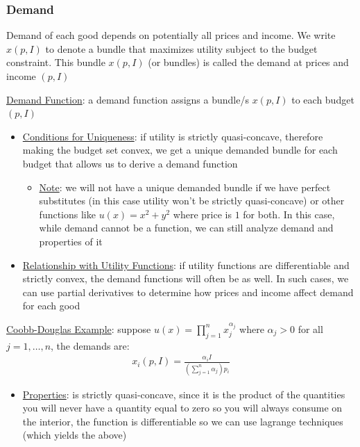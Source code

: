 \documentclass{article}
\begin{document}
\subsubsection{Demand}
Demand of each good depends on potentially all prices and income. We write $x(p,I)$ to denote a bundle that maximizes utility subject to the budget constraint. This bundle $x(p,I)$ (or bundles) is called the demand at prices and income $(p, I)$  \par \vspace{0.3em}
  \underline{Demand Function}: a demand function assigns a bundle/s $x(p, I)$ to each budget $(p,I)$
  \begin{itemize}
    \item  \underline{Conditions for Uniqueness}: if utility is strictly quasi-concave, therefore making the budget set convex, we get a unique demanded bundle for each budget that allows us to derive a demand function
    \begin{itemize}
      \item  \underline{Note}: we will not have a unique demanded bundle if we have perfect substitutes (in this case utility won't be strictly quasi-concave) or other functions like $u(x) = x^{2} + y^{2}$ where price is $1$ for both. In this case, while demand cannot be a function, we can still analyze demand and properties of it
    \end{itemize}
    \item  \underline{Relationship with Utility Functions}: if utility functions are differentiable and strictly convex, the demand functions will often be as well. In such cases, we can use partial derivatives to determine how prices and income affect demand for each good
  \end{itemize}
  \par
  \underline{Coobb-Douglas Example}: suppose $u(x) = \prod_{j=1}^{n} x_{j}^{\alpha_{j}}$ where $\alpha_{j} > 0$ for all $j = 1, \dots, n$, the demands are:
  \begin{gather*}
    x_{i}(p,I) = \frac{\alpha_{i} I}{(\sum_{j=1}^{n}\alpha_{j})p_{i}}
  \end{gather*}
  \par
  \begin{itemize}
    \item  \underline{Properties}: is strictly quasi-concave, since it is the product of the quantities you will never have a quantity equal to zero so you will always consume on the interior, the function is differentiable so we can use lagrange techniques (which yields the above)
  \end{itemize}
\end{document}
